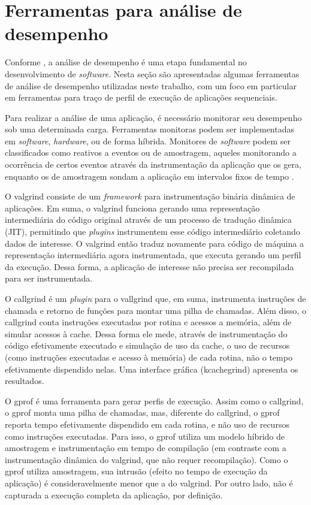 \documentclass[cic,tc]{iiufrgs}
\begin{document}
\section{Ferramentas para análise de desempenho}
\label{sec:antanal}

Conforme \cite{jain2art}, a análise de desempenho é uma etapa fundamental no
desenvolvimento de \textit{software}. Nesta seção são apresentadas algumas ferramentas
de análise de desempenho utilizadas neste trabalho, com um foco em particular
em ferramentas para traço de perfil de execução de aplicações sequenciais.

Para realizar a análise de uma aplicação, é necessário monitorar seu desempenho
sob uma determinada carga. Ferramentas monitoras podem ser implementadas em
\textit{software}, \textit{hardware}, ou de forma híbrida. Monitores de \textit{software} podem ser
classificados como reativos a eventos ou de amostragem, aqueles monitorando a
ocorrência de certos eventos através da instrumentação da aplicação que os
gera, enquanto os de amostragem sondam a aplicação em intervalos fixos de
tempo \cite{jain2art}.

O valgrind \cite{nethercote2007valgrind} consiste de um \textit{framework} para
instrumentação binária dinâmica de aplicações. Em suma, o valgrind funciona
gerando uma representação intermediária do código original através de um
processo de tradução dinâmica (JIT), permitindo que \textit{plugins} 
instrumentem esse código intermediário coletando dados de interesse. O valgrind
então traduz novamente para código de máquina a representação intermediária
agora instrumentada, que executa gerando um perfil da execução. Dessa forma, a
aplicação de interesse não precisa ser recompilada para ser instrumentada.

O callgrind \cite{weidendorfer2008sequential} é um \textit{plugin} para o
vallgrind que, em suma, instrumenta instruções de chamada e retorno de funções
para montar uma pilha de chamadas. Além disso, o callgrind conta instruções
executadas por rotina e acessos a memória, além de simular acessos à cache.
Dessa forma ele mede, através de instrumentação do código efetivamente
executado e simulação de uso da cache, o uso de recursos (como instruções
executadas e acesso à memória) de cada rotina, não o tempo efetivamente
dispendido nelas. Uma interface gráfica (kcachegrind) apresenta os resultados.

O gprof \cite{graham1982gprof} é uma ferramenta para gerar perfis de execução.
Assim como o callgrind, o gprof monta uma pilha de chamadas, mas, diferente do
callgrind, o gprof reporta tempo efetivamente dispendido em cada rotina, e não
uso de recursos como instruções executadas. Para isso, o gprof utiliza um
modelo híbrido de amostragem e instrumentação em tempo de compilação (em
contraste com a instrumentação dinâmica do valgrind, que não requer
recompilação). Como o gprof utiliza amostragem, sua intrusão (efeito no tempo
de execução da aplicação) é consideravelmente menor que a do valgrind. Por
outro lado, não é capturada a execução completa da aplicação, por definição.
\end{document}

